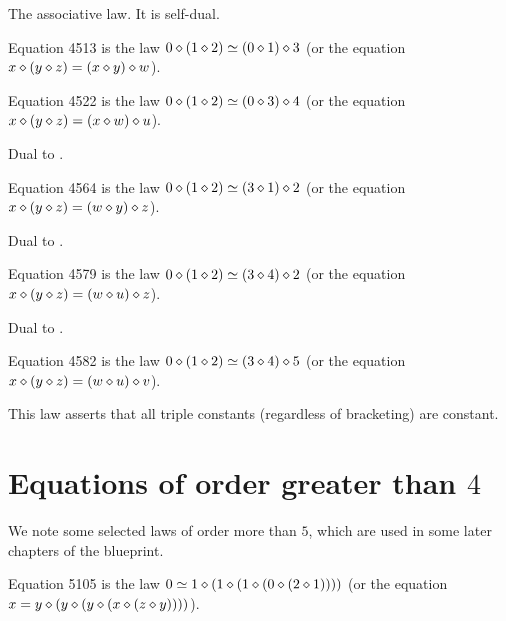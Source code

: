 The associative law. It is self-dual.

\begin{definition}[Equation 4513]\label{eq4513}\leanok{}  Equation 4513 is the law $0 \diamond (1 \diamond 2)  \simeq  (0 \diamond 1) \diamond 3$ (or the equation $x \diamond (y \diamond z) = (x \diamond y) \diamond w$).
\end{definition}

\begin{definition}[Equation 4522]\label{eq4522}\leanok{}  Equation 4522 is the law $0 \diamond (1 \diamond 2)  \simeq  (0 \diamond 3) \diamond 4$ (or the equation $x \diamond (y \diamond z) = (x \diamond w) \diamond u$).
\end{definition}

Dual to .

\begin{definition}[Equation 4564]\label{eq4564}\leanok{}  Equation 4564 is the law $0 \diamond (1 \diamond 2)  \simeq  (3 \diamond 1) \diamond 2$ (or the equation $x \diamond (y \diamond z) = (w \diamond y) \diamond z$).
\end{definition}

Dual to .

\begin{definition}[Equation 4579]\label{eq4579}\leanok{}  Equation 4579 is the law $0 \diamond (1 \diamond 2)  \simeq  (3 \diamond 4) \diamond 2$ (or the equation $x \diamond (y \diamond z) = (w \diamond u) \diamond z$).
\end{definition}

Dual to .

\begin{definition}[Equation 4582]\label{eq4582}\leanok{}  Equation 4582 is the law $0 \diamond (1 \diamond 2)  \simeq  (3 \diamond 4) \diamond 5$ (or the equation $x \diamond (y \diamond z) = (w \diamond u) \diamond v$).
\end{definition}

This law asserts that all triple constants (regardless of bracketing) are constant.

\section{Equations of order greater than \texorpdfstring{$4$}{4}}

We note some selected laws of order more than $5$, which are used in some later chapters of the blueprint.

\begin{definition}[Equation 5105]
  \label{eq5105}\leanok
  Equation 5105 is the law $0  \simeq 1 \diamond (1 \diamond (1 \diamond (0 \diamond (2 \diamond 1))))$ (or the equation $x = y \diamond (y \diamond (y \diamond (x \diamond (z \diamond y))))$).
\end{definition}

